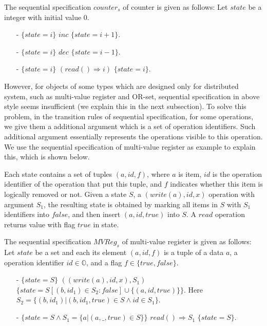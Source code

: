 {\begin{example}
\label{definition:sequential specification of counter}
The sequential specification $\mathit{counter}_s$ of counter is given as follows: Let $\mathit{state}$ be a integer with initial value $0$.

\begin{itemize}
\setlength{\itemsep}{0.5pt}
\item[-] $\{ \mathit{state} = i \}$ $\mathit{inc}$ $\{ \mathit{state} = i+1 \}$.
\item[-] $\{ \mathit{state} = i \}$ $\mathit{dec}$ $\{ \mathit{state} = i-1 \}$.
\item[-] $\{ \mathit{state} = i \}$ $(\mathit{read}() \Rightarrow i)$ $\{ \mathit{state} = i \}$.
\end{itemize}
\end{example}

However, for objects of some types which are designed only for distributed system, such as multi-value register and OR-set, sequential specification in above style seems insufficient (we explain this in the next subsection). To solve this problem, in the transition rules of sequential specification, for some operations, we give them a additional argument which is a set of operation identifiers. Such additional argument essentially represents the operations visible to this operation. We use the sequential specification of multi-value register as example to explain this, which is shown below.

Each state contains a set of tuples $(a,\mathit{id},f)$, where $a$ is item, $\mathit{id}$ is the operation identifier of the operation that put this tuple, and $f$ indicates whether this item is logically removed or not. Given a state $S$, a $(write(a),\mathit{id},x)$ operation with argument $S_1$, the resulting state is obtained by marking all items in $S$ with $S_1$ identifiers into $\mathit{false}$, and then insert $(a,id,\mathit{true})$ into $S$. A $\mathit{read}$ operation returns value with flag $\mathit{true}$ in state.


\begin{example}
\label{definition:sequential specification of multi-value register}
The sequential specification $\mathit{MVReg}_s$ of multi-value register is given as follows: Let $\mathit{state}$ be a set and each its element $(a,\mathit{id},f)$ is a tuple of a data $a$, a operation identifier $\mathit{id} \in \mathbb{O}$, and a flag $f \in \{ \mathit{true},\mathit{false} \}$.
\begin{itemize}
\setlength{\itemsep}{0.5pt}
\item[-] $\{ \mathit{state} = S \}$ $((write(a),\mathit{id},x),S_1)$ $\{ \mathit{state} = S[(b,\mathit{id}_1) \in S_2 : \mathit{false}]
\cup
\{ (a,id,\mathit{true}) \}
\}$. Here $S_2 = \{ (b,\mathit{id}_1) \vert (b,\mathit{id}_1,\mathit{true}) \in S \wedge id \in S_1 \}$.
\item[-] $\{ \mathit{state} = S \wedge S_1 = \{ a \vert (a,\_,\mathit{true}) \in S \} \}$ $read() \Rightarrow S_1$ $\{ \mathit{state} = S \}$.
\end{itemize}
\end{example}

}
